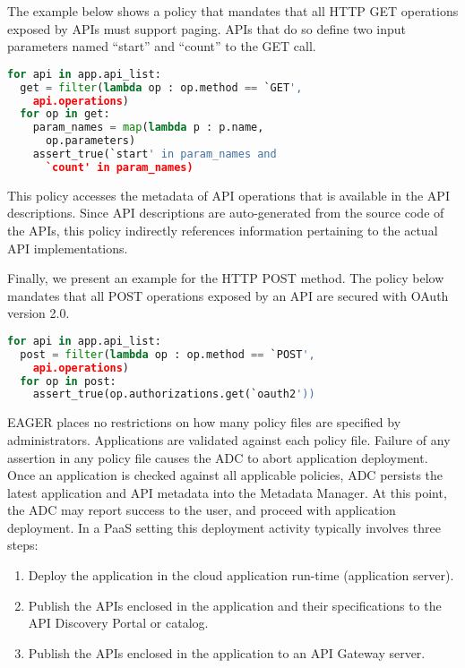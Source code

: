 The example below shows a policy that mandates 
that all HTTP GET operations exposed by APIs must support
paging. APIs that do so define two input parameters 
named ``start'' and ``count'' to the GET call.

\vspace{0.05in}
{\footnotesize
\begin{lstlisting}[language=Python, frame=single, showstringspaces=false]
for api in app.api_list:
  get = filter(lambda op : op.method == `GET',  
    api.operations)
  for op in get:
    param_names = map(lambda p : p.name, 
      op.parameters)
    assert_true(`start' in param_names and 
      `count' in param_names)
\end{lstlisting}
}
\vspace{0.05in}

This policy accesses the metadata of API operations that 
is available in the API descriptions.
Since API descriptions are auto-generated 
from the source code of the APIs, this policy indirectly
references information pertaining to the actual API implementations.

Finally, we present an example for the HTTP POST method.  The 
policy below mandates 
that all POST operations exposed by an API are secured 
with OAuth version 2.0.

\vspace{0.05in}
{\footnotesize
\begin{lstlisting}[language=Python, frame=single, showstringspaces=false]
for api in app.api_list:
  post = filter(lambda op : op.method == `POST', 
  	api.operations)
  for op in post:
    assert_true(op.authorizations.get(`oauth2'))
\end{lstlisting}
}
\vspace{0.05in}

EAGER places no restrictions on how many policy files are specified by 
administrators. Applications are validated against each policy file. Failure
of any assertion in any policy file causes the ADC to abort 
application deployment. Once an application is checked against all
applicable policies, ADC persists the latest application and API metadata into
the Metadata Manager.  At this point, the ADC may report success to the user,
and proceed with application deployment. In a PaaS setting
this deployment activity typically involves three steps:

\begin{enumerate}
\vspace{0.05in}
\item Deploy the application in the cloud application run-time (application server).
\vspace{0.05in}
\item Publish the APIs enclosed in the application and their specifications to
the API Discovery Portal or catalog.
\vspace{0.05in}
\item Publish the APIs enclosed in the application to an API Gateway server.
\vspace{0.05in}
\end{enumerate}

